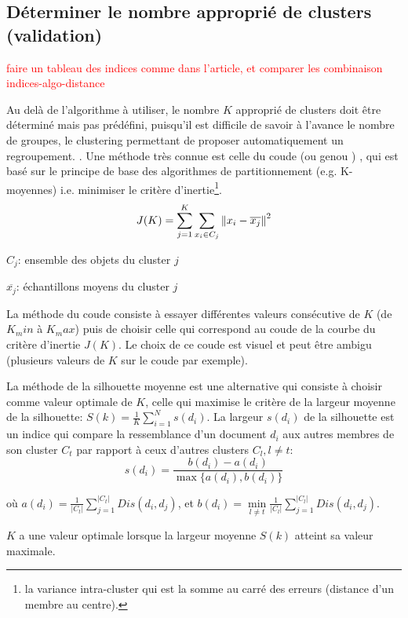 \subsection{Déterminer le nombre approprié de clusters (validation)}

\textcolor{red}{faire un tableau des indices comme dans l'article, et comparer les combinaison indices-algo-distance}

 Au delà de l’algorithme à utiliser, le nombre $K$ approprié de clusters doit être déterminé mais pas prédéfini, puisqu'il est difficile de savoir à l'avance le nombre de groupes, le clustering permettant de proposer automatiquement un regroupement. . Une méthode très connue est celle du \og coude \fg{}  (ou \og genou \fg{}) \citep{halkidi2001clustvalidation}, qui est basé sur le principe de base des algorithmes de partitionnement (e.g. K-moyennes) i.e. minimiser le critère d'inertie\footnote{la variance intra-cluster qui est la somme au carré des erreurs (distance d'un membre au centre).}.
\[J(K) = \sum\limits_{j=1}^K\sum\limits_{x_i \in C_j}\left\lVert x_i-\overline{x_j}\right\rVert^2\]

$C_j$: ensemble des objets du cluster $j$

$\overline{x_j}$: échantillons moyens du cluster $j$

La méthode du coude consiste à essayer différentes valeurs consécutive de $K$ (de $K_min$ à $K_max$) puis de choisir celle qui correspond au coude de la courbe du critère d'inertie $J(K)$. Le choix de ce coude est visuel et peut être ambigu (plusieurs valeurs de $K$ sur le coude par exemple). 

La méthode de la silhouette moyenne \citep{rousseeuw1987silhouetteclusternumber} est une alternative qui consiste à choisir comme valeur optimale de $K$, celle qui maximise le critère de la largeur moyenne de la silhouette: $S(k) = \frac{1}{K}\sum\limits_{i=1}^N s(d_i)$. La largeur $s(d_i)$ de la silhouette est un indice qui compare la ressemblance d'un document $d_i$ aux autres membres de son cluster $C_t$ par rapport à ceux d'autres clusters $C_l, l \neq t$:
\[s(d_i) = \frac{b(d_i) - a(d_i)}{\max\lbrace a(d_i),b(d_i)\rbrace}\]

où $a(d_i) = \frac{1}{\vert C_t \vert} \sum\limits_{j=1}^{\vert C_t \vert} Dis(d_i, d_j)$, et $b(d_i) = \min\limits_{l \neq t} \frac{1}{\vert C_l \vert} \sum\limits_{j=1}^{\vert C_l \vert} Dis(d_i, d_j)$.

$K$ a une valeur optimale lorsque la largeur moyenne $S(k)$ atteint sa valeur maximale.

